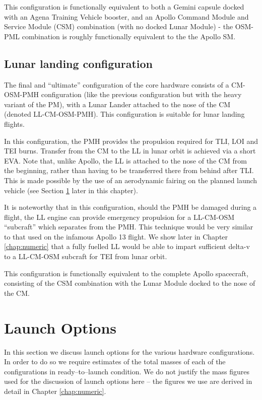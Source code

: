 \documentclass{report}
\begin{document}
This configuration is functionally equivalent to both a Gemini capsule docked with an Agena Training Vehicle booster, and an Apollo Command Module and Service Module (CSM) combination (with no docked Lunar Module) - the OSM-PML combination is roughly functionally equivalent to the the Apollo SM.

\subsection{Lunar landing configuration}

The final and ``ultimate'' configuration of the core hardware consists of a CM-OSM-PMH configuration (like the previous configuration but with the heavy variant of the PM), with a Lunar Lander attached to the nose of the CM (denoted LL-CM-OSM-PMH).  This configuration is suitable for lunar landing flights.

In this configuration, the PMH provides the propulsion required for TLI, LOI and TEI burns.  Transfer from the CM to the LL in lunar orbit is achieved via a short EVA.  Note that, unlike Apollo, the LL is attached to the nose of the CM from the beginning, rather than having to be transferred there from behind after TLI.  This is made possible by the use of an aerodynamic fairing on the planned launch vehicle (see Section \ref{sec:launchopt} later in this chapter).

It is noteworthy that in this configuration, should the PMH be damaged during a flight, the LL engine can provide emergency propulsion for a LL-CM-OSM ``subcraft'' which separates from the PMH.  This technique would be very similar to that used on the infamous Apollo 13 flight.  We show later in Chapter \ref{chap:numeric} that a fully fuelled LL would be able to impart sufficient delta-v to a LL-CM-OSM subcraft for TEI from lunar orbit.

This configuration is functionally equivalent to the complete Apollo spacecraft, consisting of the CSM combination with the Lunar Module docked to the nose of the CM.

\section{Launch Options} \label{sec:launchopt}

In this section we discuss launch options for the various hardware configurations.  In order to do so we require estimates of the total masses of each of the configurations in ready--to--launch condition.  We do not justify the mass figures used for the discussion of launch options here -- the figures we use are derived in detail in Chapter \ref{chap:numeric}.
\end{document}
